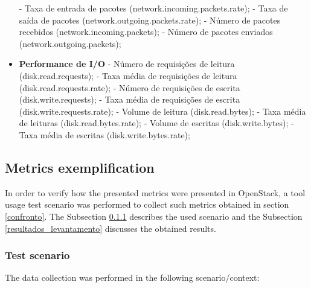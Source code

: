 \documentclass[conference]{IEEEtran}
\begin{document}
\begin{itemize}
    \subitem - Taxa de entrada de pacotes (network.incoming.packets.rate);
    \subitem - Taxa de saída de pacotes (network.outgoing.packets.rate);
    \subitem - Número de pacotes recebidos (network.incoming.packets);
    \subitem - Número de pacotes enviados (network.outgoing.packets);
  \item \textbf{Performance de I/O} 
    \subitem - Número de requisições de leitura (disk.read.requests);
    \subitem - Taxa média de requisições de leitura (disk.read.requests.rate);
    \subitem - Número de requisições de escrita (disk.write.requests);
    \subitem - Taxa média de requisições de escrita (disk.write.requests.rate);
    \subitem - Volume de leitura (disk.read.bytes);
    \subitem - Taxa média de leituras (disk.read.bytes.rate);
    \subitem - Volume de escritas (disk.write.bytes);
    \subitem - Taxa média de escritas (disk.write.bytes.rate);
 \end{itemize}

  \subsection{Metrics exemplification} 

      In order to verify how the presented metrics were presented in OpenStack, a tool usage test scenario was performed to collect
      such metrics obtained in section \ref{confronto}.
      The Subsection \ref{cenario} describes the used scenario and the Subsection \ref{resultados_levantamento} discusses the obtained results.
  
    \subsubsection{\textbf{Test scenario}} \label{cenario}
	
	The data collection was performed in the following scenario/context: 
	
\end{document}
